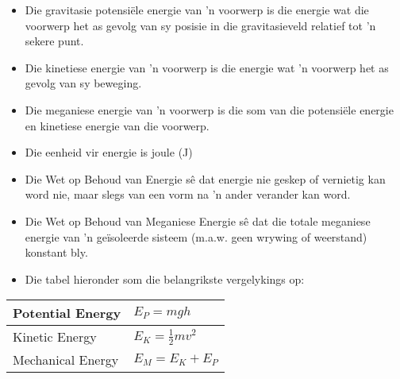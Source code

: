            \nopagebreak
      \label{m38786*id70947}\begin{itemize}[noitemsep]
            \label{m38786*uid111}\item Die gravitasie potensiële energie van   'n voorwerp is die energie wat die voorwerp het as gevolg van sy posisie in die gravitasieveld relatief tot   'n sekere punt.
\label{m38786*uid112}\item Die kinetiese energie van   'n voorwerp is die energie wat   'n voorwerp het as gevolg van sy beweging.
\label{m38786*uid113}\item Die meganiese energie van   'n voorwerp is die som van die potensiële energie en kinetiese energie van die voorwerp.
\label{m38786*uid114}\item Die eenheid vir energie is joule (J)
\label{m38786*uid115}\item Die Wet op Behoud van Energie sê dat energie nie geskep of vernietig kan word nie, maar slegs van een vorm na   'n ander verander kan word.
\label{m38786*uid116}\item Die Wet op Behoud van Meganiese Energie sê dat die totale meganiese energie van   'n geïsoleerde sisteem (m.a.w. geen wrywing of weerstand) konstant bly.
\label{m38786*uid117}\item Die tabel hieronder som die belangrikste vergelykings op:
\end{itemize}
          \begin{table}[H]
        \begin{center}
      \label{m38786*id71092}
    \noindent
      \begin{tabular}{|l|l|}\hline
        Potential Energy &
                ${E}_{P}=mgh$
             \\ \hline
        Kinetic Energy &
                ${E}_{K}=\frac{1}{2}m{v}^{2}$
              \\ \hline
        Mechanical Energy &
                ${E}_{M}={E}_{K}+{E}_{P}$
            \\ \hline
    \end{tabular}
      \end{center}
\end{table}
    \par
